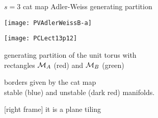 \begin{frame}{$s=3$ cat map Adler-Weiss generating partition}
\begin{center}
            \begin{minipage}[c]{0.23\textwidth}\begin{center}
\texttt{[image: PVAdlerWeissB-a]}%
            \end{center}\end{minipage}
            \hspace{5ex}
            \begin{minipage}[c]{0.46\textwidth}\begin{center}
\texttt{[image: PCLect13p12]}%
            \end{center}\end{minipage}
\end{center}
generating partition
of the unit torus with \\
rectangles $\mathcal{M}_A$ (red) and $\mathcal{M}_B$ (green)

borders given by the cat map \\
stable (blue) and
unstable (dark red) manifolds.

\medskip

[right frame] it is a plane tiling %
\end{frame}

